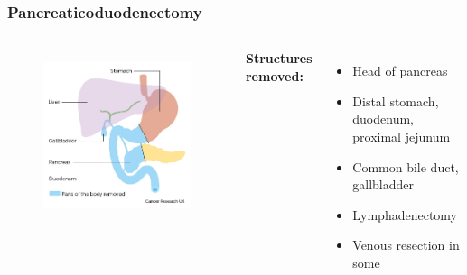 \documentclass{beamer}
\begin{document}
\begin{frame}
	\frametitle{Pancreaticoduodenectomy}
	\begin{columns}[t]
		\begin{figure}
			\centering
			\includegraphics[width=0.8\linewidth]{whipple_schematic_pre}
			\label{fig:whipple_schematic_pre}
		\end{figure}
		{\scriptsize
			\textbf{Structures removed:}
			\begin{itemize}
			\item Head of pancreas
			\item Distal stomach, duodenum, proximal jejunum
			\item  Common bile duct, gallbladder
			\item Lymphadenectomy
			\item Venous resection in some
		\end{itemize}}
	

\end{columns}
\end{frame}
\end{document}
